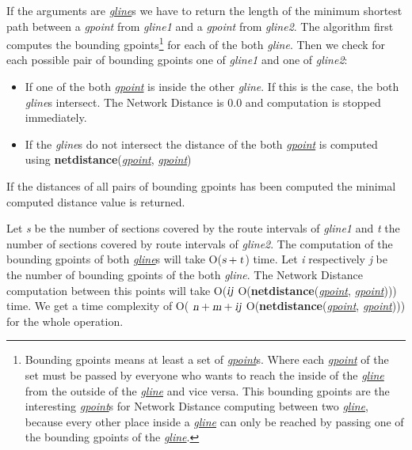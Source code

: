 \documentclass[a4paper]{article}
\newcommand{\op}[1]{\textbf{#1}}
\newcommand{\var}[1]{\textsl{#1}}
\newcommand{\dt}[1]{\textsl{\underline{#1}}}
\begin{document}
If the arguments are \dt{gline}s we have to return the length of the minimum shortest path between a \var{gpoint} from \var{gline1} and a \var{gpoint} from \var{gline2}. The algorithm first computes the bounding gpoints\footnote{Bounding gpoints means at least a set of \dt{gpoint}s. Where each \dt{gpoint} of the set must be passed by everyone who wants to reach the inside of the \dt{gline} from the outside of the \dt{gline} and vice versa. This bounding gpoints are the interesting \dt{gpoint}s for Network Distance computing between two \dt{gline}, because every other place inside a \dt{gline} can only be reached by passing one of the bounding gpoints of the \dt{gline}.} for each of the both \var{gline}. Then we check for each possible pair of bounding gpoints one of \var{gline1} and one of \var{gline2}:
\begin{itemize}
\item If one of the both \dt{gpoint} is inside the other \var{gline}. If this is the case, the both \var{gline}s intersect. The Network Distance is 0.0 and computation is stopped immediately.
\item If the \var{gline}s do not intersect the distance of the both \dt{gpoint} is computed using \op{netdistance}(\dt{gpoint}, \dt{gpoint})
\end{itemize}
If the distances of all pairs of bounding gpoints has been computed the minimal computed distance value is returned.

Let \var{s} be the number of sections covered by the route intervals of \var{gline1} and \var{t} the number of sections covered by route intervals of \var{gline2}. The computation of the bounding gpoints of both \dt{gline}s will take O($\var{s}+\var{t}$) time. Let \var{i} respectively \var{j} be the number of bounding gpoints of the both \var{gline}. The Network Distance computation between this points will take O($\var{i}\var{j}$ O(\op{netdistance}(\dt{gpoint}, \dt{gpoint}))) time. We get a time complexity of O( $\var{n} +\var{m} + \var{i}\var{j}$ O(\op{netdistance}(\dt{gpoint}, \dt{gpoint}))) for the whole operation.
\end{document}
